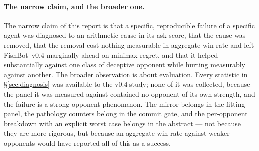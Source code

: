 \documentclass[11pt]{article}
\theoremstyle{definition}
\DeclareRobustCommand{\vfour}{\texorpdfstring{\mbox{FishBot v0.4}}{FishBot v0.4}}
\begin{document}
\paragraph{The narrow claim, and the broader one.} The narrow claim of this
report is that a specific, reproducible failure of a specific agent was
diagnosed to an arithmetic cause in its ask score, that the cause was removed,
that the removal cost nothing measurable in aggregate win rate and left \vfour{}
marginally ahead on minimax regret, and that it helped substantially against one
class of deceptive opponent while hurting measurably against another.
The broader observation is
about evaluation. Every statistic in \S\ref{sec:diagnosis} was available to the
v0.4 study; none of it was collected, because the panel it was measured against
contained no opponent of its own strength, and the failure is a strong-opponent
phenomenon. The mirror belongs in the fitting panel, the pathology counters
belong in the commit gate, and the per-opponent breakdown with an explicit worst
case belongs in the abstract --- not because they are more rigorous, but because
an aggregate win rate against weaker opponents would have reported all of this
as a success.
\end{document}
